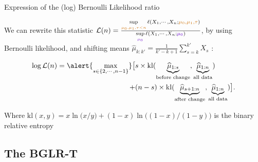 \documentclass[11pt,english,ignorenonframetext,]{beamer}
\begin{document}
\begin{frame}{Expression of the (log) Bernoulli Likelihood ratio}

  We can rewrite this statistic
  $\mathcal{L}(n) = \frac{\sup\limits_{\textcolor{gold}{\mu_0,\mu_1,\tau < n}}\ell(X_1,\cdots,X_n ; \textcolor{gold}{\mu_0,\mu_1,\tau})}{\sup\limits_{\textcolor{deeppurple}{\mu_0}}\ell(X_1,\cdots,X_n ;\textcolor{deeppurple}{\mu_0})}$,
  by using Bernoulli likelihood, and shifting means $\widehat{\mu}_{k:k'} = \frac{1}{k'-k+1} \sum\limits_{s=k}^{k'} X_s$ :

  \begin{align*}
    \log \mathcal{L}(n) = \alert{\max_{s \in \{2,\cdots,n-1\}}} \bigl[
      & s \times \mathrm{kl} (\underbrace{\widehat{\mu}_{1:s}}_{\text{before change}},\underbrace{\widehat{\mu}_{1:n}}_{\text{all data}} ) \\
      + & (n-s) \times \mathrm{kl} (\underbrace{\widehat{\mu}_{s+1:n}}_{\text{after change}},\underbrace{\widehat{\mu}_{1:n}}_{\text{all data}} ) \bigr].
  \end{align*}

  \begin{tiny}
    Where $\mathrm{kl}(x,y) =x \ln\bigl(x/y\bigr) + (1-x)\ln\bigl((1-x)/(1-y)\bigr)$ is the binary relative entropy
  \end{tiny}

\end{frame}


\subsection{\hfill{}The BGLR-T\hfill{}}
\end{document}
